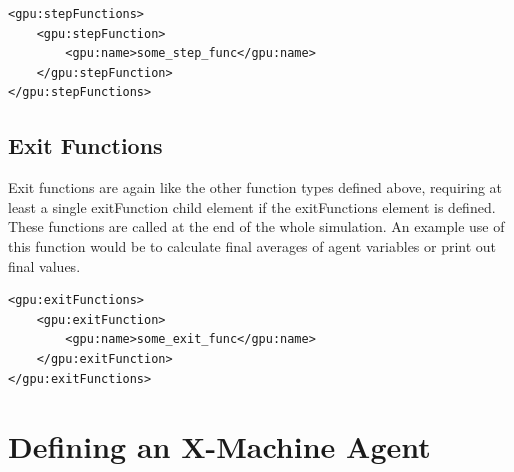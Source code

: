 \documentclass[11pt, a4paper, onecolumn, oneside]{report}
\begin{document}
\begin{verbatim}
<gpu:stepFunctions>
    <gpu:stepFunction>
        <gpu:name>some_step_func</gpu:name>
    </gpu:stepFunction>
</gpu:stepFunctions>
\end{verbatim}

\subsection{Exit Functions}
\label{sec:exitFunc}

Exit functions are again like the other function types defined above, requiring at least a single exitFunction child element if the exitFunctions element is defined. These functions are called at the end of the whole simulation. An example use of this function would be to calculate final averages of agent variables or print out final values.

\begin{verbatim}
<gpu:exitFunctions>
    <gpu:exitFunction>
        <gpu:name>some_exit_func</gpu:name>
    </gpu:exitFunction>
</gpu:exitFunctions>
\end{verbatim}


\section{Defining an X-Machine Agent}
\label{sec:23}
\end{document}
